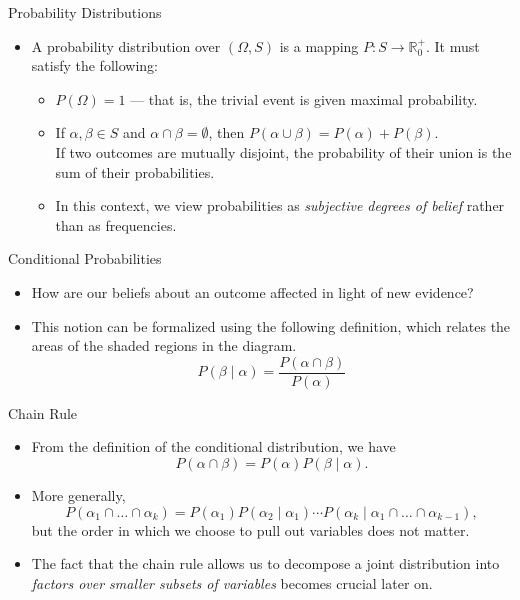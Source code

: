 \documentclass[11pt]{beamer}
\begin{document}
\begin{frame}{Probability Distributions}
\begin{itemize}
	\item A probability distribution over $(\Omega, S)$ is a mapping $P: S
	\rightarrow \mathbb{R}_{0}^{+}$. It must satisfy the following:
	\begin{itemize}
		\item $P(\Omega) = 1$ --- that is, the trivial event is given
		maximal probability.
		\item If $\alpha, \beta \in S$ and $\alpha \cap \beta =
		\emptyset$, then $P(\alpha \cup \beta) = P(\alpha) + P(\beta)$.
		\\ If two outcomes are mutually disjoint, the probability of
		their union is the sum of their probabilities.
		\item In this context, we view probabilities as \emph{subjective
		degrees of belief} rather than as frequencies.
	\end{itemize}
\end{itemize}
\end{frame}

\begin{frame}{Conditional Probabilities}
\begin{itemize}
	\item How are our beliefs about an outcome affected in light of new
	evidence?
	\item This notion can be formalized using the following definition,
	which relates the areas of the shaded regions in the diagram.
	\[
		P(\beta \;|\; \alpha) = \frac{P(\alpha \cap \beta)}{P(\alpha)}
	\]
	\centering
	{
		\footnotesize
	}
\end{itemize}
\end{frame}

\begin{frame}{Chain Rule}
\begin{itemize}
	\item From the definition of the conditional distribution, we have
	\[
		P(\alpha \cap \beta) = P(\alpha) P(\beta \;|\; \alpha).
	\]
	\item More generally,
	\[
		P(\alpha_{1} \cap \ldots \cap \alpha_{k}) = P(\alpha_{1})
		P(\alpha_{2} \;|\; \alpha_{1}) \cdots P(\alpha_{k} \;|\;
		\alpha_{1} \cap \ldots \cap \alpha_{k - 1}),
	\]
	but the order in which we choose to pull out variables does not matter.
	\item The fact that the chain rule allows us to decompose a joint
	distribution into \emph{factors over smaller subsets of variables}
	becomes crucial later on.
\end{itemize}
\end{frame}
\end{document}
